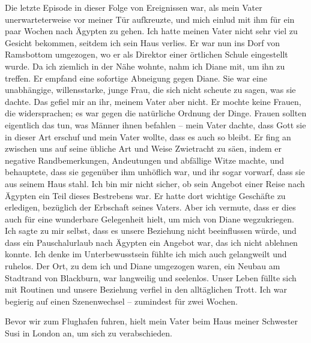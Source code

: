 \documentclass[12pt]{memoir}
\begin{document}
Die letzte Episode in dieser Folge von Ereignissen war,
als mein Vater unerwarteterweise vor meiner Tür aufkreuzte,
und mich einlud mit ihm für ein paar Wochen nach Ägypten zu gehen.
Ich hatte meinen Vater nicht sehr viel zu Gesicht bekommen,
seitdem ich sein Haus verlies.
Er war nun ins Dorf von Ramsbottom umgezogen,
wo er als Direktor einer örtlichen Schule eingestellt wurde.
Da ich ziemlich in der Nähe wohnte, nahm ich Diane mit, um ihn zu treffen.
Er empfand eine sofortige Abneigung gegen Diane.
Sie war eine unabhängige, willensstarke, junge Frau,
die sich nicht scheute zu sagen, was sie dachte.
Das gefiel mir an ihr, meinem Vater aber nicht.
Er mochte keine Frauen, die widersprachen;
es war gegen die natürliche Ordnung der Dinge.
Frauen sollten eigentlich das tun, was Männer ihnen befahlen –
mein Vater dachte, dass Gott sie in dieser Art erschuf und mein Vater wollte,
dass es auch so bleibt.
Er fing an zwischen uns auf seine übliche Art und Weise Zwietracht zu säen,
indem er negative Randbemerkungen, Andeutungen und abfällige Witze machte,
und behauptete, dass sie gegenüber ihm unhöflich war, und ihr sogar vorwarf,
dass sie aus seinem Haus stahl.
Ich bin mir nicht sicher, ob sein Angebot einer Reise nach Ägypten
ein Teil dieses Bestrebens war.
Er hatte dort wichtige Geschäfte zu erledigen,
bezüglich der Erbschaft seines Vaters.
Aber ich vermute, dass er dies auch für eine wunderbare Gelegenheit hielt,
um mich von Diane wegzukriegen.
Ich sagte zu mir selbst, dass es unsere Beziehung nicht beeinflussen würde,
und dass ein Pauschalurlaub nach Ägypten ein Angebot war,
das ich nicht ablehnen konnte.
Ich denke im Unterbewusstsein fühlte ich mich auch gelangweilt und ruhelos.
Der Ort, zu dem ich und Diane umgezogen waren,
ein Neubau am Stadtrand von Blackburn, war langweilig und seelenlos.
Unser Leben füllte sich mit Routinen und unsere Beziehung
verfiel in den alltäglichen Trott.
Ich war begierig auf einen Szenenwechsel – zumindest für zwei Wochen.

Bevor wir zum Flughafen fuhren,
hielt mein Vater beim Haus meiner Schwester Susi in London an,
um sich zu verabschieden.
\end{document}

